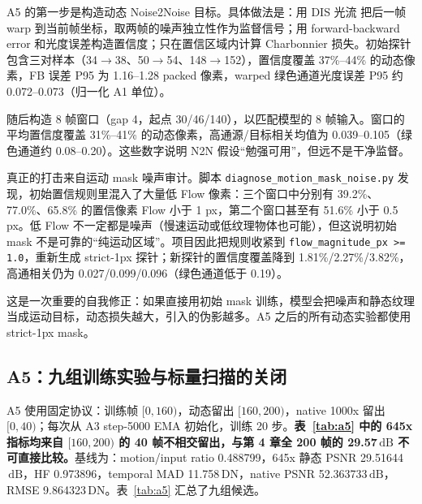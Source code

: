 \documentclass[11pt,a4paper,UTF8,fontset=fandol]{ctexart}
\newcommand{\dn}{\ensuremath{\,\mathrm{DN}}}
\newcommand{\db}{\ensuremath{\,\mathrm{dB}}}
\begin{document}
A5 的第一步是构造动态 Noise2Noise 目标。具体做法是：用 DIS 光流\cite{r11} 把后一帧 warp 到当前帧坐标，取两帧的噪声独立性作为监督信号；用 forward-backward error 和光度误差构造置信度；只在置信区域内计算 Charbonnier 损失。初始探针包含三对样本（34$\rightarrow$38、50$\rightarrow$54、148$\rightarrow$152），置信度覆盖 37\%--44\% 的动态像素，FB 误差 P95 为 1.16--1.28 packed 像素，warped 绿色通道光度误差 P95 约 0.072--0.073（归一化 A1 单位）。

随后构造 8 帧窗口（gap 4，起点 30/46/140），以匹配模型的 8 帧输入。窗口的平均置信度覆盖 31\%--41\% 的动态像素，高通源/目标相关均值为 0.039--0.105（绿色通道约 0.08--0.20）。这些数字说明 N2N 假设“勉强可用”，但远不是干净监督。

真正的打击来自运动 mask 噪声审计。脚本 \texttt{diagnose\_motion\_mask\_noise.py} 发现，初始置信规则里混入了大量低 Flow 像素：三个窗口中分别有 39.2\%、77.0\%、65.8\% 的置信像素 Flow 小于 1 px，第二个窗口甚至有 51.6\% 小于 0.5 px。低 Flow 不一定都是噪声（慢速运动或低纹理物体也可能），但这说明初始 mask 不是可靠的“纯运动区域”。项目因此把规则收紧到 \texttt{flow\_magnitude\_px >= 1.0}，重新生成 strict-1px 探针；新探针的置信度覆盖降到 1.81\%/2.27\%/3.82\%，高通相关仍为 0.027/0.099/0.096（绿色通道低于 0.19）。

这是一次重要的自我修正：如果直接用初始 mask 训练，模型会把噪声和静态纹理当成运动目标，动态损失越大，引入的伪影越多。A5 之后的所有动态实验都使用 strict-1px mask。

\subsection{A5：九组训练实验与标量扫描的关闭}

A5 使用固定协议：训练帧 $[0,160)$，动态留出 $[160,200)$，native 1000x 留出 $[0,40)$；每次从 A3 step-5000 EMA 初始化，训练 20 步。\textbf{表~\ref{tab:a5} 中的 645x 指标均来自 $[160,200)$ 的 40 帧不相交留出，与第 4 章全 200 帧的 29.57\db{} 不可直接比较。}基线为：motion/input ratio 0.488799，645x 静态 PSNR 29.51644\db，HF 0.973896，temporal MAD 11.758\dn，native PSNR 52.363733\db，RMSE 9.864323\dn。表~\ref{tab:a5} 汇总了九组候选。
\end{document}
